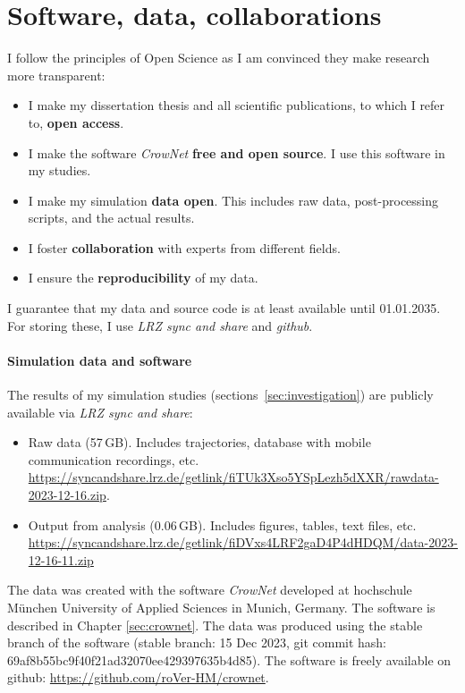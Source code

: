 





\chapter{Software, data, collaborations}
\label{sec:availability}

I follow the principles of Open Science as I am convinced they make research more transparent: 
\begin{itemize}
\item I make my dissertation thesis and all scientific publications, to which I refer to, \textbf{open access}.
\item I make the software \textit{CrowNet} \textbf{free and open source}. I use this software in my studies.
\item I make my simulation \textbf{data open}. This includes raw data, post-processing scripts, and the actual results.
\item I foster \textbf{collaboration} with experts from different fields.
\item I ensure the \textbf{reproducibility} of my data.
\end{itemize}
I guarantee that my data and source code is at least available until 01.01.2035. For storing these, I use \textit{LRZ sync and share} and \textit{github}.




\subsubsection*{Simulation data and software}
The results of my simulation studies (sections~\ref{sec:investigation}) are publicly available via \textit{LRZ sync and share}:
\begin{itemize}
\item  Raw data (57\,GB). Includes trajectories, database with mobile communication recordings, etc. \url{https://syncandshare.lrz.de/getlink/fiTUk3Xso5YSpLezh5dXXR/rawdata-2023-12-16.zip}. 
\item Output from analysis (0.06\,GB). Includes figures, tables, text files, etc. \url{https://syncandshare.lrz.de/getlink/fiDVxs4LRF2gaD4P4dHDQM/data-2023-12-16-11.zip}
\end{itemize} 
The data was created with the software \textit{CrowNet} developed at hochschule München University of Applied Sciences in Munich, Germany. The software is described in Chapter \ref{sec:crownet}. The data was produced using the stable branch of the software  (stable branch: 15 Dec 2023, git commit hash: 69af8b55bc9f40f21ad32070ee429397635b4d85).
The software is freely available on github: \url{https://github.com/roVer-HM/crownet}. 

